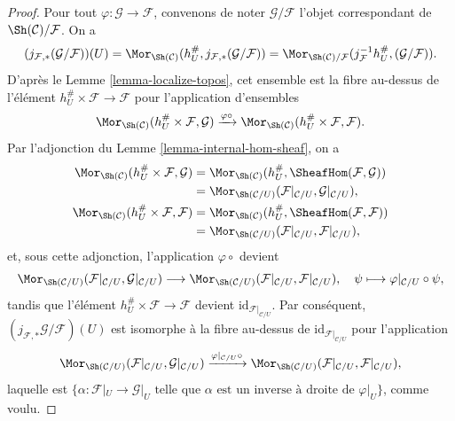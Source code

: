 \begin{proof}
Pour tout $\varphi : \mathcal{G} \to \mathcal{F}$, convenons de noter
$\mathcal{G}/\mathcal{F}$ l’objet correspondant de
$\Sh(\mathcal{C})/\mathcal{F}$. On a
$$
(j_{\mathcal{F}, *}(\mathcal{G}/\mathcal{F}))(U) =
\Mor_{\Sh(\mathcal{C})}(h_U^\#, j_{\mathcal{F}, *}(\mathcal{G}/\mathcal{F})) =
\Mor_{\Sh(\mathcal{C})/\mathcal{F}}(j_{\mathcal{F}}^{-1}h_U^{\#},
(\mathcal{G}/\mathcal{F})).
$$
D’après le Lemme \ref{lemma-localize-topos}, cet ensemble est la fibre
au-dessus de l’élément $h_U^\# \times \mathcal{F} \to \mathcal{F}$ pour
l’application d’ensembles
$$
\Mor_{\Sh(\mathcal{C})}(h_U^\# \times \mathcal{F}, \mathcal{G})
\xrightarrow{\varphi \circ}
\Mor_{\Sh(\mathcal{C})}(h_U^\# \times \mathcal{F}, \mathcal{F}).
$$
Par l’adjonction du Lemme \ref{lemma-internal-hom-sheaf}, on a
\begin{align*}
\Mor_{\Sh(\mathcal{C})}(h_U^{\#}\times\mathcal{F}, \mathcal{G})
& =
\Mor_{\Sh(\mathcal{C})}(h_U^{\#},\SheafHom(\mathcal{F}, \mathcal{G})) \\
& =
\Mor_{\Sh(\mathcal{C}/U)}(\mathcal{F}|_{\mathcal{C}/U},
\mathcal{G}|_{\mathcal{C}/U}), \\
\Mor_{\Sh(\mathcal{C})}(h_U^{\#} \times \mathcal{F}, \mathcal{F})
& =
\Mor_{\Sh(\mathcal{C})}(h_U^{\#},\SheafHom(\mathcal{F},\mathcal{F})) \\
& =
\Mor_{\Sh(\mathcal{C}/U)}(\mathcal{F}|_{\mathcal{C}/U},
\mathcal{F}|_{\mathcal{C}/U}),
\end{align*}
et, sous cette adjonction, l’application $\varphi\circ$ devient
$$
\Mor_{\Sh(\mathcal{C}/U)}(\mathcal{F}|_{\mathcal{C}/U},
\mathcal{G}|_{\mathcal{C}/U})
\longrightarrow
\Mor_{\Sh(\mathcal{C}/U)}(\mathcal{F}|_{\mathcal{C}/U},
\mathcal{F}|_{\mathcal{C}/U}),\quad
\psi \longmapsto \varphi|_{\mathcal{C}/U} \circ \psi,
$$
tandis que l’élément $h_U^\# \times \mathcal{F} \to \mathcal{F}$ devient
$\text{id}_{\mathcal{F}|_{\mathcal{C}/U}}$.
Par conséquent, $(j_{\mathcal{F}, *}\mathcal{G}/\mathcal{F})(U)$ est
isomorphe à la fibre au-dessus de $\text{id}_{\mathcal{F}|_{\mathcal{C}/U}}$
pour l’application
$$
\Mor_{\Sh(\mathcal{C}/U)}(\mathcal{F}|_{\mathcal{C}/U},
\mathcal{G}|_{\mathcal{C}/U})
\xrightarrow{\varphi|_{\mathcal{C}/U}\circ}
\Mor_{\Sh(\mathcal{C}/U)}(\mathcal{F}|_{\mathcal{C}/U},
\mathcal{F}|_{\mathcal{C}/U}),
$$
laquelle est $\{\alpha : \mathcal{F}|_U \to \mathcal{G}|_U
\text{ telle que } \alpha \text{ est un inverse à droite de }\varphi|_U \}$,
comme voulu.
\end{proof}

